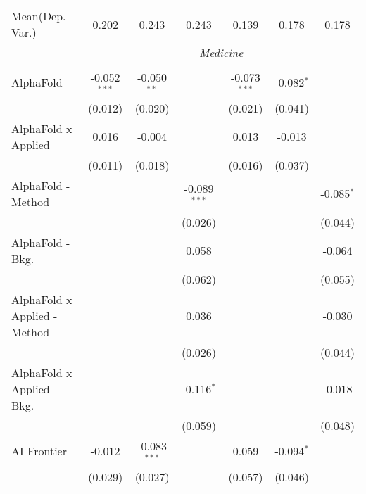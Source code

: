 \begin{tabular}{lcccccc}
Mean(Dep. Var.) & 0.202 & 0.243 & 0.243 & 0.139 & 0.178 & 0.178 \\
 & \multicolumn{6}{c}{\textit{Medicine}} \\ \\
   AlphaFold                      & -0.052$^{***}$ & -0.050$^{**}$  &                & -0.073$^{***}$ & -0.082$^{*}$ &   \\   
                                  & (0.012)        & (0.020)        &                & (0.021)        & (0.041)      &   \\   
   AlphaFold x Applied            & 0.016          & -0.004         &                & 0.013          & -0.013       &   \\   
                                  & (0.011)        & (0.018)        &                & (0.016)        & (0.037)      &   \\   
   AlphaFold - Method             &                &                & -0.089$^{***}$ &                &              & -0.085$^{*}$\\   
                                  &                &                & (0.026)        &                &              & (0.044)\\   
   AlphaFold - Bkg.               &                &                & 0.058          &                &              & -0.064\\   
                                  &                &                & (0.062)        &                &              & (0.055)\\   
   AlphaFold x Applied - Method   &                &                & 0.036          &                &              & -0.030\\   
                                  &                &                & (0.026)        &                &              & (0.044)\\   
   AlphaFold x Applied - Bkg.     &                &                & -0.116$^{*}$   &                &              & -0.018\\   
                                  &                &                & (0.059)        &                &              & (0.048)\\   
   AI Frontier                    & -0.012         & -0.083$^{***}$ &                & 0.059          & -0.094$^{*}$ &   \\   
                                  & (0.029)        & (0.027)        &                & (0.057)        & (0.046)      &   \\   

\end{tabular}

